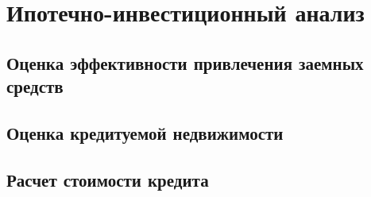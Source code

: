 \section{Ипотечно-инвестиционный анализ}
\subsection{Оценка эффективности привлечения заемных средств}
\subsection{Оценка кредитуемой недвижимости}
\subsection{Расчет стоимости кредита}